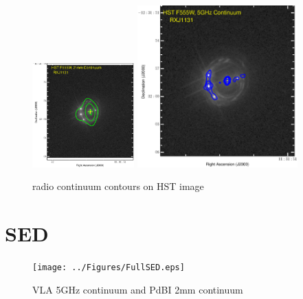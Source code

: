 \documentclass[]{emulateapj}
\begin{document}
\begin{figure}[tbph]
\centering
\includegraphics[width=0.35\textwidth]{../Figures/F555W_ContPdBI.eps}
\includegraphics[width=0.55\textwidth]{../Figures/F555W_ContVLA.eps}
\caption{
radio continuum contours on HST image
 \label{fig:}}
\end{figure}


\section{SED}
\begin{figure}[tbph]
\centering
\texttt{[image: ../Figures/FullSED.eps]}	 
\caption{VLA 5GHz continuum and PdBI 2mm continuum
 \label{fig:}}
\end{figure}







\end{document}
